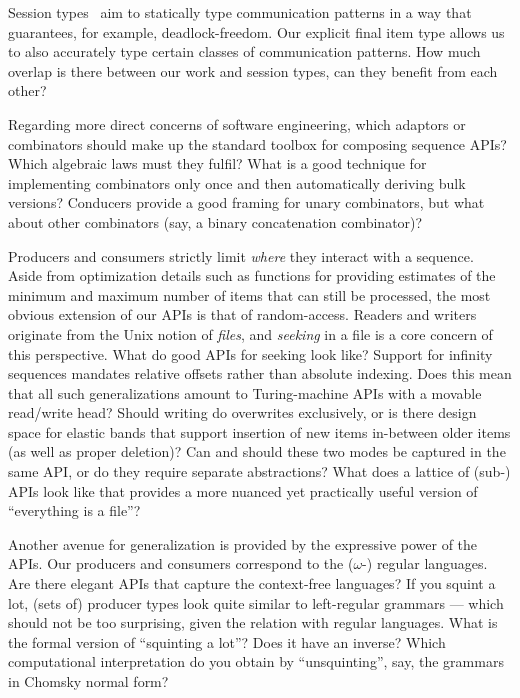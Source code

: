 \documentclass[sigplan,screen,10pt,review]{acmart}
\begin{document}
Session types~\cite{dezani2010sessions}\cite{huttel2016foundations} aim to statically type communication patterns in a way that guarantees, for example, deadlock-freedom. Our explicit final item type allows us to also accurately type certain classes of communication patterns. How much overlap is there between our work and session types, can they benefit from each other?

Regarding more direct concerns of software engineering, which adaptors or combinators should make up the standard toolbox for composing sequence APIs? Which algebraic laws must they fulfil? What is a good technique for implementing combinators only once and then automatically deriving bulk versions? Conducers provide a good framing for unary combinators, but what about other combinators (say, a binary concatenation combinator)?

Producers and consumers strictly limit \textit{where} they interact with a sequence. Aside from optimization details such as functions for providing estimates of the minimum and maximum number of items that can still be processed, the most obvious extension of our APIs is that of random-access. Readers and writers originate from the Unix notion of \textit{files}, and \textit{seeking} in a file is a core concern of this perspective. What do good APIs for seeking look like? Support for infinity sequences mandates relative offsets rather than absolute indexing. Does this mean that all such generalizations amount to Turing-machine APIs with a movable read/write head? Should writing do overwrites exclusively, or is there design space for elastic bands that support insertion of new items in-between older items (as well as proper deletion)? Can and should these two modes be captured in the same API, or do they require separate abstractions? What does a lattice of (sub-) APIs look like that provides a more nuanced yet practically useful version of ``everything is a file''?

Another avenue for generalization is provided by the expressive power of the APIs. Our producers and consumers correspond to the ($\omega$-) regular languages. Are there elegant APIs that capture the context-free languages? If you squint a lot, (sets of) producer types look quite similar to left-regular grammars --- which should not be too surprising, given the relation with regular languages. What is the formal version of ``squinting a lot''? Does it have an inverse? Which computational interpretation do you obtain by ``unsquinting'', say, the grammars in Chomsky normal form?
\end{document}
